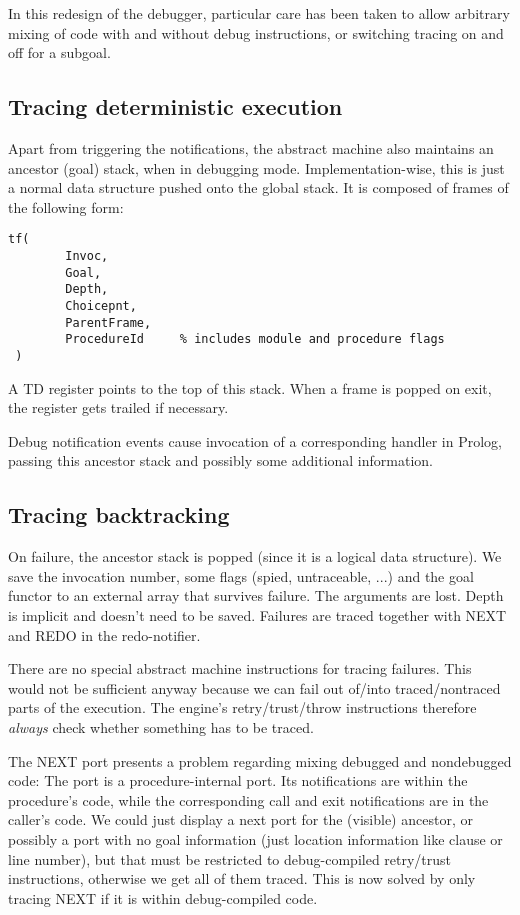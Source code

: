 In this redesign of the debugger, particular care has been taken to
allow arbitrary mixing of code with and without debug instructions,
or switching tracing on and off for a subgoal.


\subsection{Tracing deterministic execution}

Apart from triggering the notifications, the abstract machine also
maintains an ancestor (goal) stack, when in debugging mode. 
Implementation-wise, this is just a normal data structure pushed onto
the global stack.  It is composed of frames of the following form:
\begin{verbatim}
tf(
        Invoc,
        Goal,
        Depth,
        Choicepnt,
        ParentFrame,
        ProcedureId     % includes module and procedure flags
 )
\end{verbatim}

A TD  register points to the top of this stack. When a frame is popped
on exit, the register gets trailed if necessary.

Debug notification events cause invocation of a corresponding handler
in Prolog, passing this ancestor stack and possibly some additional
information.


\subsection{Tracing backtracking}

On failure, the ancestor stack is popped (since it is a logical data
structure).  We save the invocation number, some flags (spied,
untraceable, ...) and the goal functor to an external array that
survives failure.  The arguments are lost.  Depth is implicit and
doesn't need to be saved.  Failures are traced together with NEXT and
REDO in the redo-notifier.

There are no special abstract machine instructions for tracing failures.
This would not be sufficient anyway because we can fail out of/into
traced/nontraced parts of the execution. The engine's retry/trust/throw
instructions therefore {\em always} check whether something has to be traced.

The NEXT port presents a problem regarding mixing debugged and
nondebugged code:  The port is a procedure-internal port.  Its
notifications are within the procedure's code, while the corresponding
call and exit notifications are in the caller's code.  We could just
display a next port for the (visible) ancestor, or possibly a port
with no goal information (just location information like clause or
line number), but that must be restricted to debug-compiled
retry/trust instructions, otherwise we get all of them traced.  This
is now solved by only tracing NEXT if it is within debug-compiled code.

